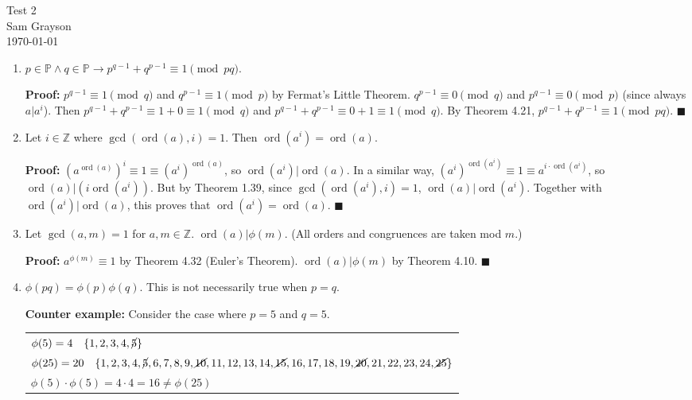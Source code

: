 \documentclass[12pt,letterpaper,english]{article}
\DeclareMathOperator{\ord}{ord}
\newcommand{\qedhere}{{\tiny \(\blacksquare\)}}
\begin{document}
\doublespacing
\begin{center}
{\Large Test 2} \\[14pt]
{\large Sam Grayson} \\[0pt]
{\today} \\
\end{center}

\singlespacing
\setlength{\parindent}{0pt}

\begin{enumerate}

\item \(p \in \mathbb P \wedge q \in \mathbb P \rightarrow p^{q-1} + q^{p-1} \equiv 1 \pmod {pq}\).

\textbf{Proof:} \(p^{q-1} \equiv 1 \pmod q\) and \(q^{p-1} \equiv 1 \pmod p\) by Fermat's Little Theorem. \(q^{p-1} \equiv 0 \pmod q\) and \(p^{q-1} \equiv 0 \pmod p\) (since always \(a|a^i\)). Then \(p^{q-1} + q^{p-1} \equiv 1 + 0 \equiv 1 \pmod q\) and \(p^{q-1} + q^{p-1} \equiv 0 + 1 \equiv 1 \pmod q\).  By Theorem 4.21, \(p^{q-1} + q^{p-1} \equiv 1 \pmod {pq}\). \qedhere

\item Let \(i \in \mathbb Z\) where \(\gcd(\ord(a), i) = 1\). Then \(\ord(a^i) = \ord(a)\).

\textbf{Proof:} \((a^{\ord(a)})^i \equiv 1 \equiv (a^i)^{\ord(a)}\), so \(\ord(a^i)|\ord(a)\). In a similar way, \((a^i)^{\ord(a^i)} \equiv 1 \equiv a^{i \cdot \ord(a^i)}\), so \(\ord(a)|(i \ord(a^i))\). But by Theorem 1.39, since \(\gcd(\ord(a^i), i) = 1\), \(\ord(a)|\ord(a^i)\). Together with \(\ord(a^i)|\ord(a)\), this proves that \(\ord(a^i) = \ord(a)\). \qedhere

\item Let \(\gcd(a, m) = 1\) for \(a, m \in \mathbb Z\). \(\ord(a)|\phi(m)\). (All orders and congruences are taken mod \(m\).)

\textbf{Proof:} \(a^{\phi(m)} \equiv 1\) by Theorem 4.32 (Euler's Theorem). \(\ord(a)|\phi(m)\) by Theorem 4.10. \qedhere

\item \(\phi(pq) = \phi(p) \phi(q)\). This is not necessarily true when \(p = q\).

\textbf{Counter example:} Consider the case where \(p = 5\) and \(q = 5\).

\begin{tabular}[t]{l}
\(\phi(5) = 4 \quad \{1, 2, 3, 4, \cancel{5}\}\) \\
\(\phi(25) = 20 \quad \{1, 2, 3, 4, \cancel{5}, 6, 7, 8, 9, \cancel{10}, 11, 12, 13, 14, \cancel{15}, 16, 17, 18, 19, \cancel{20}, 21, 22, 23, 24, \cancel{25}\}\) \\
\(\phi(5) \cdot \phi(5) = 4 \cdot 4 = 16 \neq \phi(25)\) \\
\end{tabular}


\end{enumerate}
\end{document}
